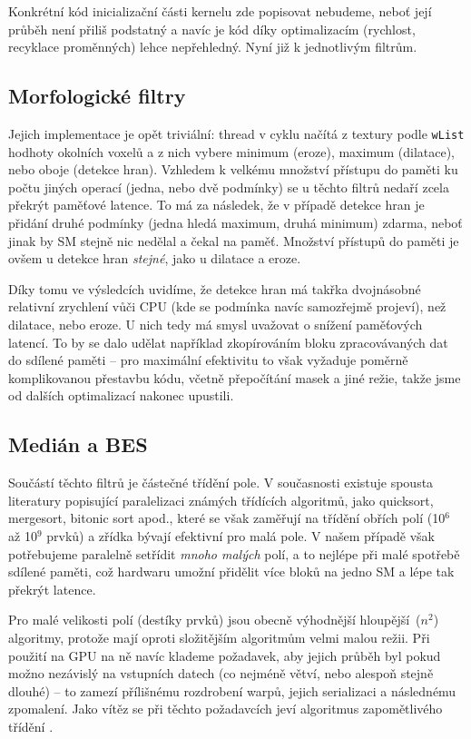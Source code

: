     Konkrétní kód inicializační části kernelu zde popisovat nebudeme, neboť její průběh není přiliš podstatný a navíc je kód díky optimalizacím (rychlost, recyklace proměnných) lehce nepřehledný. Nyní již k jednotlivým filtrům.
    
    \subsection{Morfologické filtry}
    
    Jejich implementace je opět triviální: thread v cyklu načítá z textury podle {\tt wList} hodhoty okolních voxelů a z nich vybere minimum (eroze), maximum (dilatace), nebo oboje (detekce hran). Vzhledem k velkému množství přístupu do paměti ku počtu jiných operací (jedna, nebo dvě podmínky) se u těchto filtrů nedaří zcela překrýt paměťové latence. To má za následek, že v případě detekce hran je přidání druhé podmínky (jedna hledá maximum, druhá minimum) \bq zdarma\eq, neboť jinak by SM stejně nic nedělal a čekal na paměť. Množství přístupů do paměti je ovšem u detekce hran \emph{stejné}, jako u dilatace a eroze. 
    
    Díky tomu ve výsledcích uvidíme, že detekce hran má takřka dvojnásobné relativní zrychlení vůči CPU (kde se podmínka navíc samozřejmě projeví), než dilatace, nebo eroze. U nich tedy má smysl uvažovat o snížení paměťových latencí. To by se dalo udělat například zkopírováním bloku zpracovávaných dat do sdílené paměti -- pro maximální efektivitu to však vyžaduje poměrně komplikovanou přestavbu kódu, včetně přepočítání masek a jiné režie, takže jsme od dalších optimalizací nakonec upustili.
    
    \subsection{Medián a BES}
    
    Součástí těchto filtrů je částečné třídění pole. V současnosti existuje spousta literatury popisující paralelizaci známých třídících algoritmů, jako quicksort, mergesort, bitonic sort apod., které se však zaměřují na třídění obřích polí (10$^6$ až 10$^9$ prvků) a zřídka bývají efektivní pro malá pole. V našem případě však potřebujeme paralelně setřídit \emph{mnoho malých} polí, a to nejlépe při malé spotřebě sdílené paměti, což hardwaru umožní přidělit více bloků na jedno SM a lépe tak překrýt latence. 
    
    Pro malé velikosti polí (destíky prvků) jsou obecně výhodnější \bq hloupější\eq ~\OOO($n^2$) algoritmy, protože mají oproti složitějším algoritmům velmi malou režii. Při použití na GPU na ně navíc klademe požadavek, aby jejich průběh byl pokud možno nezávislý na vstupních datech (co nejméně větví, nebo alespoň stejně dlouhé) -- to zamezí přílišnému rozdrobení warpů, jejich serializaci a následnému zpomalení. Jako vítěz se při těchto požadavcích jeví algoritmus zapomětlivého třídění \cite{Forgetful}.
    
